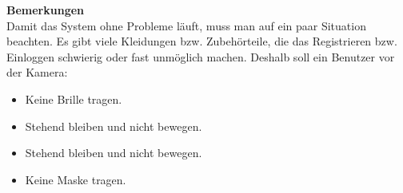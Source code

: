 \textbf{Bemerkungen}\\
Damit das System ohne Probleme läuft, muss man auf ein paar Situation beachten. Es gibt viele Kleidungen bzw. Zubehörteile, die das Registrieren bzw. Einloggen schwierig oder fast unmöglich machen. Deshalb soll ein Benutzer vor der Kamera: 
\begin{itemize}
	\item Keine Brille tragen. 
	\item Stehend bleiben und nicht bewegen. 
	\item Stehend bleiben und nicht bewegen. 
	\item Keine Maske tragen. 
\end{itemize}
